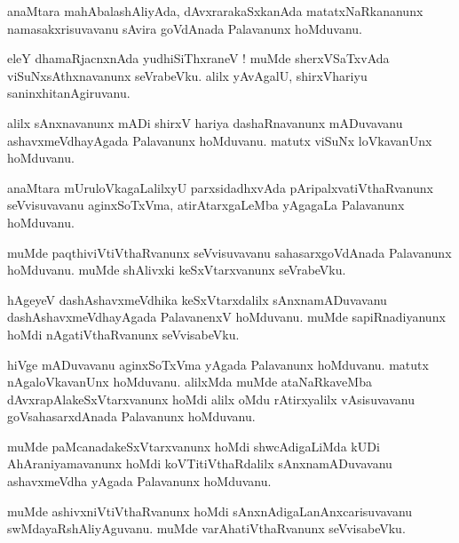 \documentclass{article}
\begin{document}
\begin{mn}
anaMtara mahAbalashAliyAda, dAvxrarakaSxkanAda matatxNaRkananunx namasakxrisuvavanu sAvira
goVdAnada Palavanunx hoMduvanu.
\end{mn}

\begin{mn}
eleY dhamaRjacnxnAda yudhiSiThxraneV ! muMde sherxVSaTxvAda viSuNxsAthxnavanunx seVrabeVku.
alilx yAvAgalU, shirxVhariyu saninxhitanAgiruvanu.
\end{mn}

\begin{mn}
alilx sAnxnavanunx mADi shirxV hariya dashaRnavanunx mADuvavanu ashavxmeVdhayAgada Palavanunx 
hoMduvanu. matutx viSuNx loVkavanUnx hoMduvanu.
\end{mn}

\begin{mn}
anaMtara mUruloVkagaLalilxyU parxsidadhxvAda pAripalxvatiVthaRvanunx seVvisuvavanu aginxSoTxVma, 
atirAtarxgaLeMba yAgagaLa Palavanunx hoMduvanu.
\end{mn}

\begin{mn}
muMde paqthiviVtiVthaRvanunx seVvisuvavanu sahasarxgoVdAnada Palavanunx hoMduvanu. muMde shAlivxki 
keSxVtarxvanunx seVrabeVku.
\end{mn}

\begin{mn}
hAgeyeV dashAshavxmeVdhika keSxVtarxdalilx sAnxnamADuvavanu dashAshavxmeVdhayAgada PalavanenxV 
hoMduvanu. muMde  sapiRnadiyanunx hoMdi nAgatiVthaRvanunx seVvisabeVku.
\end{mn}

\begin{mn}
hiVge mADuvavanu aginxSoTxVma yAgada Palavanunx hoMduvanu. matutx nAgaloVkavanUnx hoMduvanu.
alilxMda muMde ataNaRkaveMba dAvxrapAlakeSxVtarxvanunx hoMdi alilx  oMdu rAtirxyalilx vAsisuvavanu 
goVsahasarxdAnada Palavanunx hoMduvanu.
\end{mn}

\begin{mn}
muMde paMcanadakeSxVtarxvanunx hoMdi shwcAdigaLiMda kUDi AhAraniyamavanunx hoMdi 
koVTitiVthaRdalilx sAnxnamADuvavanu ashavxmeVdha yAgada Palavanunx hoMduvanu.
\end{mn}

\begin{mn}
muMde ashivxniVtiVthaRvanunx hoMdi sAnxnAdigaLanAnxcarisuvavanu swMdayaRshAliyAguvanu. muMde 
varAhatiVthaRvanunx seVvisabeVku.
\end{mn}
\end{document}
